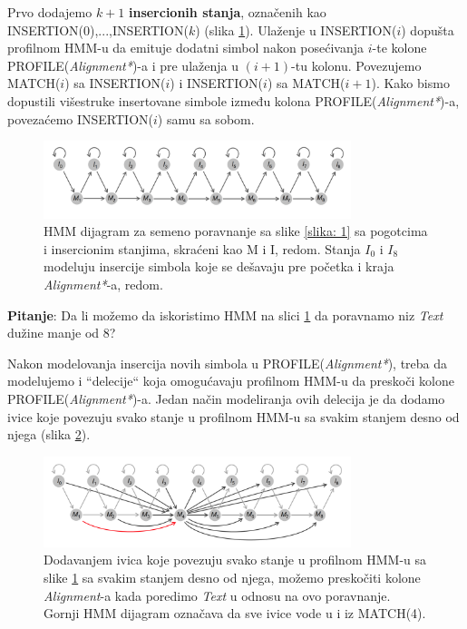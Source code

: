 Prvo dodajemo $ k+1 $ \textbf{insercionih stanja}, označenih kao INSERTION(0),...,INSERTION($ k $) (slika \ref{slika: 3}). Ulaženje u INSERTION($ i $) dopušta profilnom HMM-u da emituje dodatni simbol nakon posećivanja $ i $-te kolone PROFILE(\textit{Alignment*})-a i pre ulaženja u $ (i+1) $-tu kolonu. Povezujemo MATCH($ i $) sa INSERTION($ i $) i INSERTION($ i $) sa MATCH($ i+1 $). Kako bismo dopustili višestruke insertovane simbole između kolona PROFILE(\textit{Alignment*})-a, povezaćemo INSERTION($ i $) samu sa sobom.

\begin{figure}[H]
\centering
\includegraphics[width=0.8\textwidth]{poglavlja/10/slike/slika3.png}
\caption{HMM dijagram za semeno poravnanje sa slike \ref{slika: 1} sa pogotcima i insercionim stanjima, skraćeni kao M i I, redom. Stanja $I_0$ i $I_8$ modeluju insercije simbola koje se dešavaju pre početka i kraja \textit{Alignment*}-a, redom.}
\label{slika: 3}
\end{figure}

\textbf{Pitanje}: Da li možemo da iskoristimo HMM na slici \ref{slika: 3} da poravnamo niz \textit{Text} dužine manje od 8?

Nakon modelovanja insercija novih simbola u PROFILE(\textit{Alignment*}), treba da modelujemo i ``delecije`` koja omogućavaju profilnom HMM-u da preskoči kolone PROFILE(\textit{Alignment*})-a. Jedan način modeliranja ovih delecija je da dodamo ivice koje povezuju svako stanje u profilnom HMM-u sa svakim stanjem desno od njega (slika \ref{slika: 4}).

\begin{figure}[H]
\centering
\includegraphics[width=0.8\textwidth]{poglavlja/10/slike/slika4.png}
\caption{Dodavanjem ivica koje povezuju svako stanje u profilnom HMM-u sa slike \ref{slika: 3} sa svakim stanjem desno od njega, možemo preskočiti kolone \textit{Alignment}-a kada poredimo \textit{Text} u odnosu na ovo poravnanje. Gornji HMM dijagram označava da sve ivice vode u i iz MATCH(4).}
\label{slika: 4}
\end{figure}


